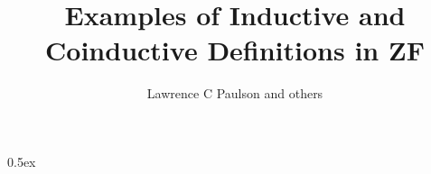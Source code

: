 \documentclass[11pt,a4paper]{article}
\begin{document}
\title{Examples of Inductive and Coinductive Definitions in ZF}
\author{Lawrence C Paulson and others}
\maketitle

\tableofcontents

\parindent 0pt\parskip 0.5ex

\end{document}
